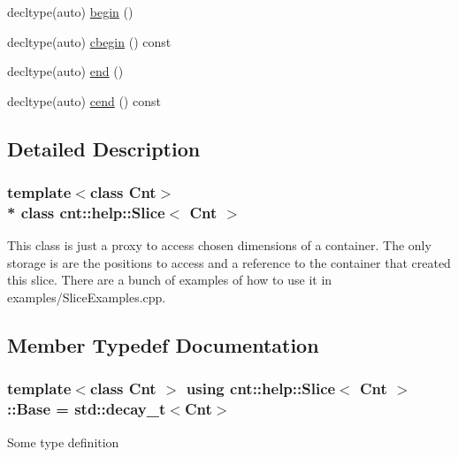 {\bf }\par
\begin{DoxyCompactItemize}
\item 
decltype(auto) \hyperlink{classcnt_1_1help_1_1Slice_aa5686f75940716e2568165e3b88d89d3}{begin} ()
\item 
decltype(auto) \hyperlink{classcnt_1_1help_1_1Slice_a8c37189a46abc4b6e5d3bbe19d070def}{cbegin} () const 
\item 
decltype(auto) \hyperlink{classcnt_1_1help_1_1Slice_a0bebfdc0b631e2462b54b2bd44059b76}{end} ()
\item 
decltype(auto) \hyperlink{classcnt_1_1help_1_1Slice_a73ee554773b81ac81ade64dcd87cf000}{cend} () const 
\end{DoxyCompactItemize}



\subsection{Detailed Description}
\subsubsection*{template$<$class Cnt$>$\\*
class cnt\+::help\+::\+Slice$<$ Cnt $>$}

This class is just a proxy to access chosen dimensions of a container. The only storage is are the positions to access and a reference to the container that created this slice. There are a bunch of examples of how to use it in \textquotesingle{}examples/\+Slice\+Examples.\+cpp\textquotesingle{}. 

\subsection{Member Typedef Documentation}
\subsubsection[{\texorpdfstring{Base}{Base}}]{\setlength{\rightskip}{0pt plus 5cm}template$<$class Cnt $>$ using {\bf cnt\+::help\+::\+Slice}$<$ Cnt $>$\+::{\bf Base} =  std\+::decay\+\_\+t$<$Cnt$>$}\hypertarget{classcnt_1_1help_1_1Slice_a485438785457de81fe42a4b07ec4ad32}{}\label{classcnt_1_1help_1_1Slice_a485438785457de81fe42a4b07ec4ad32}
Some type definition 
